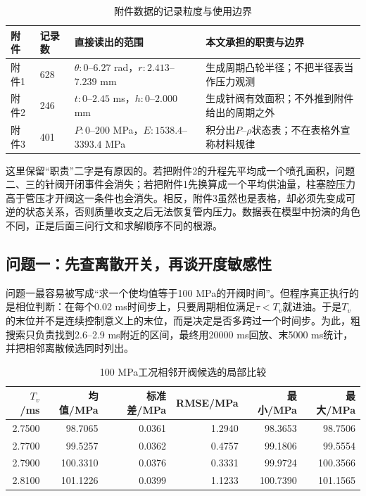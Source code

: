 \documentclass[UTF8,11pt,a4paper]{ctexart}
\begin{document}
\begin{table}[H]
\centering
\caption{附件数据的记录粒度与使用边界}
\label{tab:input-audit-a}
\small
\begin{tabularx}{\textwidth}{p{2.1cm}p{2.2cm}p{3.4cm}X}
\toprule
附件 & 记录数 & 直接读出的范围 & 本文承担的职责与边界\\
\midrule
附件1 & 628 & $\theta:0$--$6.27$ rad，$r:2.413$--$7.239$ mm & 生成周期凸轮半径；不把半径表当作压力观测\\
附件2 & 246 & $t:0$--$2.45$ ms，$h:0$--$2.000$ mm & 生成针阀有效面积；不外推到附件给出的周期之外\\
附件3 & 401 & $P:0$--$200$ MPa，$E:1538.4$--$3393.4$ MPa & 积分出$P$--$\rho$状态表；不在表格外宣称材料规律\\
\bottomrule
\end{tabularx}
\end{table}

这里保留“职责”二字是有原因的。若把附件2的升程先平均成一个喷孔面积，问题二、三的针阀开闭事件会消失；若把附件1先换算成一个平均供油量，柱塞腔压力高于管压才开阀这一条件也会消失。相反，附件3虽然也是表格，却必须先变成可逆的状态关系，否则质量收支之后无法恢复管内压力。数据表在模型中扮演的角色不同，正是后面三问行文和求解顺序不同的根源。

\subsection{问题一：先查离散开关，再谈开度敏感性}

问题一最容易被写成“求一个使均值等于100 MPa的开阀时间”。但程序真正执行的是相位判断：在每个$0.02$ ms时间步上，只要周期相位满足$\tau<T_v$就进油。于是$T_v$的末位并不是连续控制意义上的末位，而是决定是否多跨过一个时间步。为此，粗搜索只负责找到2.6--2.9 ms附近的区间，最终用20000 ms回放、末5000 ms统计，并把相邻离散候选同时列出。

\begin{table}[H]
\centering
\caption{100 MPa工况相邻开阀候选的局部比较}
\label{tab:q1-local-a}
\small
\begin{tabular}{rrrrrr}
\toprule
$T_v$/ms & 均值/MPa & 标准差/MPa & RMSE/MPa & 最小/MPa & 最大/MPa\\
\midrule
2.7500 & 98.7065 & 0.0361 & 1.2940 & 98.3653 & 98.7506\\
2.7700 & 99.5257 & 0.0362 & 0.4757 & 99.1806 & 99.5554\\
2.7900 & 100.3310 & 0.0376 & 0.3331 & 99.9724 & 100.3566\\
2.8100 & 101.1226 & 0.0399 & 1.1233 & 100.7390 & 101.1565\\
\bottomrule
\end{tabular}
\end{table}
\end{document}
